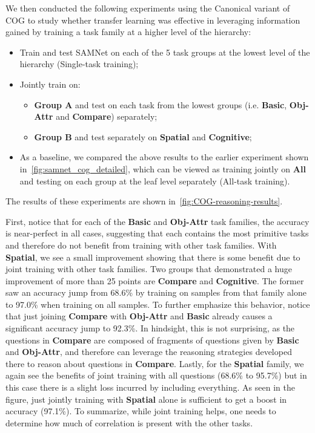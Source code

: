 We then conducted the following experiments using the Canonical variant of COG to study 
whether transfer learning was effective in leveraging information gained by training a task family at a higher level
of the hierarchy:
 \begin{itemize}
 	\compresslist
	\item Train and test SAMNet on each of the 5 task groups at the lowest level of the hierarchy (Single-task training);
	\item Jointly train on:
	\begin{itemize}
		\item 	 \textbf{Group A} and test on each task from the lowest groups (i.e. \textbf{Basic}, \textbf{Obj-Attr} and \textbf{Compare}) separately;
		\item \textbf{Group B} and test separately on \textbf{Spatial} and \textbf{Cognitive};
	\end{itemize}
	\item As a baseline, we compared the above results to the earlier experiment shown in~\cref{fig:samnet_cog_detailed}, which
	can be viewed as training jointly on \textbf{All} and testing on each group at the leaf level separately (All-task training).
\end{itemize}

The results of these experiments are shown in~\cref{fig:COG-reasoning-results}.

First, notice that for each of the \textbf{Basic} and \textbf{Obj-Attr} task families, the accuracy is near-perfect in all cases, suggesting that each contains the most primitive tasks and therefore do not benefit from training with other task families.
With \textbf{Spatial}, we see a small improvement showing that there is some benefit due to joint training with other task families.
Two groups that demonstrated a huge improvement of more than 25 points are \textbf{Compare} and \textbf{Cognitive}.
The former saw an accuracy jump from 68.6\% by training on samples from that family alone
to 97.0\% when training on all samples. To further emphasize this behavior, notice that 
just joining \textbf{Compare} with \textbf{Obj-Attr} and \textbf{Basic} already causes a significant accuracy jump to 92.3\%. 
In hindsight, this is not surprising, as the questions in \textbf{Compare} are composed
of fragments of questions given by \textbf{Basic} and \textbf{Obj-Attr}, and therefore can leverage the reasoning strategies developed there to reason about questions in \textbf{Compare}.
Lastly, for the \textbf{Spatial} family, we again see the benefits of joint training with all questions (68.6\% to 95.7\%) but in this case there
is a slight loss incurred by including everything. As seen in the figure, just jointly training with \textbf{Spatial} alone is sufficient to get a boost in accuracy (97.1\%). To summarize, while joint training helps, one needs to determine how much of correlation is present with the other tasks.

